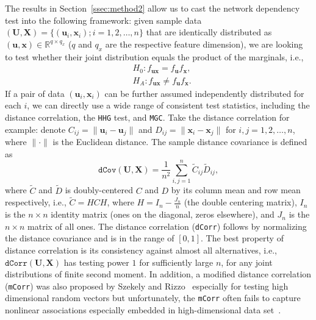 \documentclass[11pt]{article}
\theoremstyle{definition}
\begin{document}
The results in Section~\ref{ssec:method2} allow us to cast the network dependency test into the following framework: given sample data $(\mathbf{U}, \mathbf{X}) = \{  (\mathbf{u}_{i}, \mathbf{x}_{i} ) ; i = 1,2, \ldots, n \}$ that are identically distributed as $(\mathbf{u},\mathbf{x}) \in \mathbb{R}^{q \times q_x}$ ($q$ and $q_x$ are the respective feature dimension), we are looking to test whether their joint distribution equals the product of the marginals, i.e.,
\begin{align*}
& H_{0}: f_{\mathbf{u}\mathbf{x}}=f_{\mathbf{u}}f_{\mathbf{x}},\\
& H_{A}: f_{\mathbf{u}\mathbf{x}}\neq f_{\mathbf{u}}f_{\mathbf{x}}.
\end{align*}
If a pair of data $(\mathbf{u}_{i}, \mathbf{x}_{i} )$ can be further assumed independently distributed for each $i$, we can directly use a wide range of consistent test statistics, including the distance correlation, the \texttt{HHG} test, and \texttt{MGC}. Take the distance correlation for example: denote $C_{ij} = \parallel \mathbf{u}_{i} - \mathbf{u}_{j} \parallel$ and $D_{ij} = \parallel \mathbf{x}_{i} - \mathbf{x}_{j} \parallel$ for $i,j=1,2, \ldots ,n$, where $\parallel \cdot \parallel$ is the Euclidean distance. The sample distance covariance is defined as 
\begin{equation}	 
\label{eq:dCov}
\texttt{dCov}(\mathbf{U}, \mathbf{X}) = \frac{1}{n^2} \sum\limits_{i,j=1}^{n} \tilde{C}_{ij} \tilde{D}_{ij},
\end{equation}
where $\tilde{C}$ and $\tilde{D}$ is doubly-centered $C$ and $D$ by its column mean and row mean respectively, i.e., $\tilde{C}=HCH$, where $H=I_{n}-\frac{J_{n}}{n}$ (the double centering matrix), $I_n$ is the $n \times n$ identity matrix (ones on the diagonal, zeros elsewhere), and $J_n$ is the $n \times n$ matrix of all ones. The distance correlation (\texttt{dCorr}) follows by normalizing the distance covariance and is in the range of $[0,1]$. The best property of distance correlation is its consistency against almost all alternatives, i.e., $\texttt{dCorr}(\mathbf{U}, \mathbf{X})$ has testing power $1$ for sufficiently large $n$, for any joint distributions of finite second moment. In addition, a modified distance correlation (\texttt{mCorr}) was also proposed by Szekely and Rizzo~\cite{szekely2013distance} especially for testing high dimensional random vectors but unfortunately, the \texttt{mCorr} often fails to capture nonlinear associations especially embedded in high-dimensional data set~\citep{shen2016discovering, heller2012consistent}. 
\end{document}
